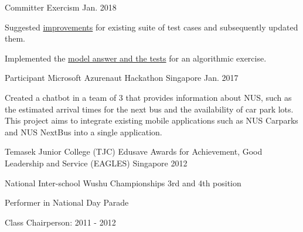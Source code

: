 
\begin{cventries}


  \cventry
    {Committer} %
    {Exercism} %
    {} %
    {Jan. 2018} %
    {
      \begin{cvitems} %
        \item {Suggested \href{https://github.com/issues?utf8=\%E2\%9C\%93&q=repo\%3Aexercism\%2Fproblem-specifications+involves\%3AZhiyuan-Amos}{improvements} for existing suite of test cases and subsequently updated them.}
        \item {Implemented the \href{https://github.com/issues?utf8=\%E2\%9C\%93&q=repo\%3Aexercism\%2Fjava+involves\%3AZhiyuan-Amos}{model answer and the tests} for an algorithmic exercise.}
      \end{cvitems}
    }

  \cventry
    {Participant} %
    {Microsoft Azurenaut Hackathon} %
    {Singapore} %
    {Jan. 2017} %
    {
      \begin{cvitems} %
        \item {Created a chatbot in a team of 3 that provides information about NUS, such as the estimated arrival times for the next bus and the availability of car park lots. This project aims to integrate existing mobile applications such as NUS Carparks and NUS NextBus into a single application.}
      \end{cvitems}
    }

  \cventry
    {Temasek Junior College (TJC)} %
    {Edusave Awards for Achievement, Good Leadership and Service (EAGLES)} %
    {Singapore} %
    {2012} %
    {
      \begin{cvitems} %
        \item {National Inter-school Wushu Championships 3rd and 4th position}
        \item {Performer in National Day Parade}
        \item {Class Chairperson: 2011 - 2012}
      \end{cvitems}
    }

\end{cventries}
